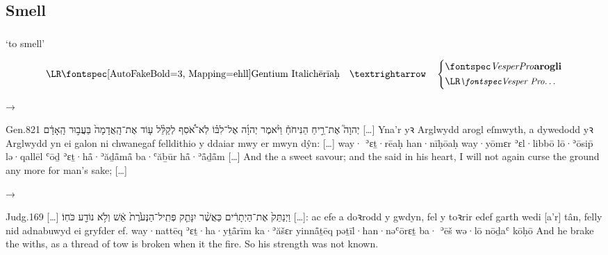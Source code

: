 \subsection{Smell}




\subsubsection{}

\begin{frame}{ ‘to smell’}
	\begin{center}
		$$
		\mtext{\bh{hērīaḥ}} \transto
		\begin{dcases}
			\C{\hl{arogli}}\\
			\mtext{\small\C{…}}
		\end{dcases}
		$$
	\end{center}
\end{frame}


\begin{frame}{ → }
	\begin{example}{Gen.}{8}{21}{}{}
		\quoling
		{ יְהוָה֮ אֶת־רֵ֣יחַ הַנִּיחֹחַ֒ וַיֹּ֨אמֶר יְהוָ֜ה אֶל־לִבּ֗וֹ לֹֽא־אֹ֠סִף לְקַלֵּ֨ל ע֤וֹד אֶת־הָֽאֲדָמָה֙ בַּעֲב֣וּר הָֽאָדָ֔ם […]}
		{Yna’r  yꝛ Arglwydd arogl eſmwyth, a dywedodd yꝛ Arglwydd yn ei galon ni chwanegaf felldithio y ddaiar mwy er mwyn dŷn: […]}
		{way· {\YHWH} ʾɛṯ·rēaḥ han·nīḥōaḥ way·yōmɛr {\YHWH} ʾɛl·libbō lō·ʾōsip̄ lə·qallēl ʿōḏ ʾɛṯ·hå̄·ʾăḏå̄må̄ ba·ʿăḇūr hå̄·ʾå̄ḏå̄m […]}
		{And the {\LORD}  a sweet savour; and the {\LORD} said in his heart, I will not again curse the ground any more for man’s sake; […]}
	\end{example}
\end{frame}


\begin{frame}{ → }
	\begin{example}{Judg.}{16}{9}{}{}
		\quoling
		{[…] וַיְנַתֵּק֙ אֶת־הַיְתָרִ֔ים כַּאֲשֶׁ֨ר יִנָּתֵ֤ק פְּתִֽיל־הַנְּעֹ֙רֶת֙  אֵ֔שׁ וְלֹ֥א נוֹדַ֖ע כֹּחֽוֹ׃}
		{[…]: ac efe a doꝛrodd y gwdyn, fel y toꝛrir edef garth wedi  tân, felly nid adnabuwyd ei gryfder ef.}
		{way·nattēq ʾɛṯ·ha·yṯå̄rīm ka·ʾăšɛr yinnå̄ṯēq pəṯīl·han·nəʿōrɛṯ ba· ʾēš wə·lō nōḏaʿ kōḥō}
		{And he brake the withs, as a thread of tow is broken when it  the fire. So his strength was not known.}
	\end{example}
\end{frame}


